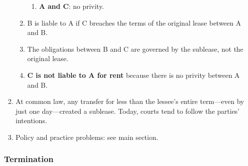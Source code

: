 \begin{enumerate}
\begin{enumerate}
\begin{enumerate}
            \item \textbf{A and C}: no privity.
        \end{enumerate}
        \item B is liable to A if C breaches the terms of the original lease 
        between A and B.
        \item The obligations between B and C are governed by the sublease, 
        not the original lease.
        \item \textbf{C is not liable to A for rent} because there is no 
        privity between A and B.
    \end{enumerate}
    \item At common law, any transfer for less than the lessee's entire 
    term---even by just one day---created a sublease. Today, courts tend to 
    follow the parties' intentions.
    \item Policy and practice problems: see main section.
\end{enumerate}

\subsubsection{Termination}


